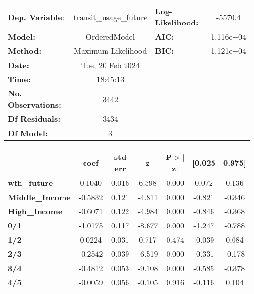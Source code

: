 \documentclass{report}
\begin{document}
\begin{center}
\begin{tabular}{lclc}
\toprule
\textbf{Dep. Variable:}    & transit\_usage\_future & \textbf{  Log-Likelihood:    } &   -5570.4   \\
\textbf{Model:}            &      OrderedModel      & \textbf{  AIC:               } & 1.116e+04   \\
\textbf{Method:}           &   Maximum Likelihood   & \textbf{  BIC:               } & 1.121e+04   \\
\textbf{Date:}             &    Tue, 20 Feb 2024    & \textbf{                     } &             \\
\textbf{Time:}             &        18:45:13        & \textbf{                     } &             \\
\textbf{No. Observations:} &           3442         & \textbf{                     } &             \\
\textbf{Df Residuals:}     &           3434         & \textbf{                     } &             \\
\textbf{Df Model:}         &              3         & \textbf{                     } &             \\
\bottomrule
\end{tabular}
\begin{tabular}{lcccccc}
                        & \textbf{coef} & \textbf{std err} & \textbf{z} & \textbf{P$> |$z$|$} & \textbf{[0.025} & \textbf{0.975]}  \\
\midrule
\textbf{wfh\_future}    &       0.1040  &        0.016     &     6.398  &         0.000        &        0.072    &        0.136     \\
\textbf{Middle\_Income} &      -0.5832  &        0.121     &    -4.811  &         0.000        &       -0.821    &       -0.346     \\
\textbf{High\_Income}   &      -0.6071  &        0.122     &    -4.984  &         0.000        &       -0.846    &       -0.368     \\
\textbf{0/1}            &      -1.0175  &        0.117     &    -8.677  &         0.000        &       -1.247    &       -0.788     \\
\textbf{1/2}            &       0.0224  &        0.031     &     0.717  &         0.474        &       -0.039    &        0.084     \\
\textbf{2/3}            &      -0.2542  &        0.039     &    -6.519  &         0.000        &       -0.331    &       -0.178     \\
\textbf{3/4}            &      -0.4812  &        0.053     &    -9.108  &         0.000        &       -0.585    &       -0.378     \\
\textbf{4/5}            &      -0.0059  &        0.056     &    -0.105  &         0.916        &       -0.116    &        0.104     \\
\bottomrule
\end{tabular}
\end{center}
\end{document}
